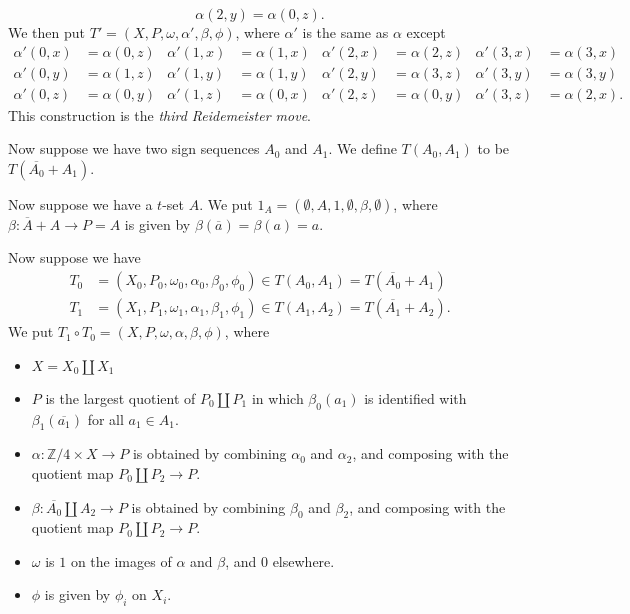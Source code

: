 \documentclass{amsart}
\newcommand{\Z}         {{\mathbb{Z}}}
\newcommand{\al}        {\alpha}
\newcommand{\bt}        {\beta}
\newcommand{\om}        {\omega}
\newcommand{\ov}[1]     {\overline{#1}}
\newcommand{\tm}        {\times}
\renewcommand{\:}{\colon}
\theoremstyle{definition}
\begin{document}
\begin{enumerate}
\[     \al(2,y) = \al(0,z).
  \]
  We then put $T'=(X,P,\om,\al',\bt,\phi)$, where $\al'$ is the same
  as $\al$ except 
  \begin{align*}
   \al'(0,x) &= \al(0,z) & 
   \al'(1,x) &= \al(1,x) & 
   \al'(2,x) &= \al(2,z) & 
   \al'(3,x) &= \al(3,x) \\
   \al'(0,y) &= \al(1,z) & 
   \al'(1,y) &= \al(1,y) & 
   \al'(2,y) &= \al(3,z) & 
   \al'(3,y) &= \al(3,y) \\
   \al'(0,z) &= \al(0,y) & 
   \al'(1,z) &= \al(0,x) & 
   \al'(2,z) &= \al(0,y) & 
   \al'(3,z) &= \al(2,x).
  \end{align*}
  This construction is the \emph{third Reidemeister move}.
\end{enumerate}

Now suppose we have two sign sequences $A_0$ and $A_1$.  We define
$T(A_0,A_1)$ to be $T(\ov{A_0}+A_1)$.  

Now suppose we have a $t$-set $A$.  We put
$1_A=(\emptyset,A,1,\emptyset,\bt,\emptyset)$, where 
$\bt\:\ov{A}+A\to P=A$ is given by $\bt(\ov{a})=\bt(a)=a$.

Now suppose we have 
\begin{align*}
 T_0 &= (X_0,P_0,\om_0,\al_0,\bt_0,\phi_0) \in T(A_0,A_1) = T(\ov{A_0}+A_1) \\
 T_1 &= (X_1,P_1,\om_1,\al_1,\bt_1,\phi_1) \in T(A_1,A_2) = T(\ov{A_1}+A_2).
\end{align*}
We put $T_1\circ T_0=(X,P,\om,\al,\bt,\phi)$, where 
\begin{itemize}
 \item $X=X_0\amalg X_1$
 \item $P$ is the largest quotient of $P_0\amalg P_1$ in which
  $\bt_0(a_1)$ is identified with $\bt_1(\ov{a_1})$ for all $a_1\in A_1$.
 \item $\al\:\Z/4\tm X\to P$ is obtained by combining $\al_0$ and
  $\al_2$, and composing with the quotient map $P_0\amalg P_2\to P$.
 \item $\bt\:\ov{A_0}\amalg A_2\to P$  is obtained by combining $\bt_0$ and
  $\bt_2$, and composing with the quotient map $P_0\amalg P_2\to P$.
 \item $\om$ is $1$ on the images of $\al$ and $\bt$, and $0$
  elsewhere. 
 \item $\phi$ is given by $\phi_i$ on $X_i$.
\end{itemize}

\begin{bibdiv}
\begin{biblist}
\end{biblist}
\end{bibdiv}
\end{document}
